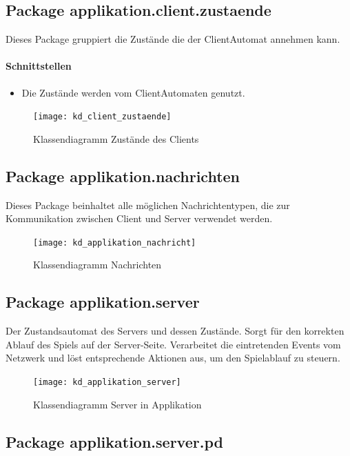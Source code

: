 \documentclass[12pt,halfparskip]{scrartcl}
\begin{document}
	\subsection{Package applikation.client.zustaende}

		Dieses Package gruppiert die Zustände die der ClientAutomat annehmen kann.

		\paragraph{Schnittstellen}
		\begin{itemize}
			\item Die Zustände werden vom ClientAutomaten genutzt.
		\end{itemize}
		
		\begin{figure}[H]
			\centering
			\texttt{[image: kd\_client\_zustaende]}
			\caption{Klassendiagramm Zustände des Clients}
			\label{fig:kd_client_zustaende}
		\end{figure}
	
\subsection{Package applikation.nachrichten}

	Dieses Package beinhaltet alle möglichen Nachrichtentypen, die zur Kommunikation zwischen Client und Server verwendet werden.
	\begin{figure}[H]
		\centering
		\texttt{[image: kd\_applikation\_nachricht]}
		\caption{Klassendiagramm Nachrichten}
		\label{fig:kd_applikation_nachricht}
	\end{figure}

\subsection{Package applikation.server}

	Der Zustandsautomat des Servers und dessen Zustände. Sorgt für den korrekten Ablauf des Spiels auf der Server-Seite. Verarbeitet die eintretenden Events vom Netzwerk und löst entsprechende Aktionen aus, um den Spielablauf zu steuern.

	\begin{figure}[H]
		\centering
		\texttt{[image: kd\_applikation\_server]}
		\caption{Klassendiagramm Server in Applikation}
		\label{fig:kd_applikation_server}
	\end{figure}
	
	\subsection{Package applikation.server.pd}
\end{document}
